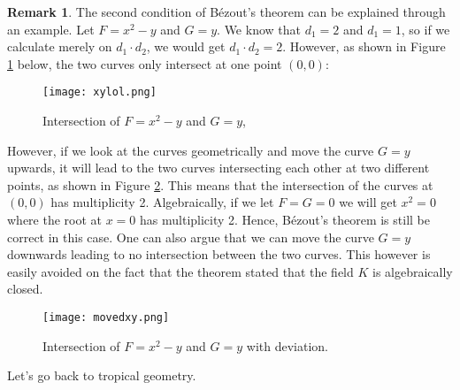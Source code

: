 \documentclass[]{article}
\theoremstyle{definition}
\numberwithin{equation}{section}
\newtheorem{rmk}[thm]{Remark}
\renewcommand{\.}{\,.}
\begin{document}
\begin{rmk} \label{REEEE}
The second condition of B\'ezout's theorem can be explained through an example. Let $F=x^2-y$ and $G=y$. We know that $d_1=2$ and  $d_1=1$, so if we calculate merely on $d_1\cdot d_2$, we would get $d_1\cdot d_2=2$. However, as shown in Figure \ref{fig:14} below, the two curves only intersect at one point $(0,0)$:

\begin{figure}[H]
	\centering
	\texttt{[image: xylol.png]}
	\caption{Intersection of $F=x^2-y$ and $G=y$,}
	\label{fig:14} \end{figure}
However, if we look at the curves geometrically and move the curve $G=y$ upwards, it will lead to the two curves intersecting each other at two different points, as shown in Figure \ref{fig:15}. This means that the intersection of the curves at $(0,0)$ has multiplicity 2. Algebraically, if we let $F=G=0$ we will get $x^2=0$ where the root at $x=0$ has multiplicity 2. Hence, B\'ezout's theorem is still be correct in this case. One can also argue that we can move the curve $G=y$ downwards leading to no intersection between the two curves. This however is easily avoided on the fact that the theorem stated that the field $K$ is algebraically closed.
\begin{figure}[H]
	\centering
	\texttt{[image: movedxy.png]}
	\caption{Intersection of $F=x^2-y$ and $G=y$ with deviation.}
	\label{fig:15} \end{figure}
\end{rmk}
Let's go back to tropical geometry.
\end{document}
